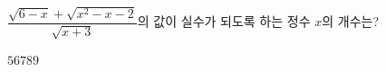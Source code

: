 \hspace*{2mm}\begin{minipage}[t]{\dimexpr\linewidth-2mm\relax}\vspace{0pt}
$\dfrac{\sqrt{6-x}+\sqrt{x^2-x-2}}{\sqrt{x+3}}$의 값이 실수가 되도록 하는 정수 $x$의 개수는?
\begin{choices32}{$5$}{$6$}{$7$}{$8$}{$9$}\end{choices32}\end{minipage}

